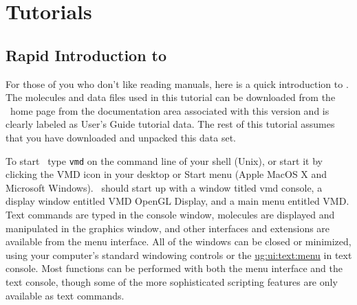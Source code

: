 %
%
%


\chapter{Tutorials}
\label{chapter:tutorial:ug}

\section{Rapid Introduction to \VMD}
For those of you who don't like reading manuals, here is a quick
introduction to \VMD.  The molecules and data files used in this tutorial 
can be downloaded from the \VMD\ home page from the documentation area 
associated with this version and is clearly labeled as User's Guide 
tutorial data.  The rest of this tutorial assumes that you have 
downloaded and unpacked this data set.

To start \VMD\ type {\tt vmd} on the command line of your shell (Unix), or
start it by clicking the VMD icon in your desktop or Start menu (Apple MacOS
X and Microsoft Windows).  \VMD\ should start up with a window titled {\sf
vmd console}, a display window entitled {\sf VMD OpenGL Display}, and a main
menu entitled {\sf VMD}.  Text commands are typed in the console window,
molecules are displayed and manipulated in the graphics window, and other
interfaces and extensions are available from the menu interface.  All of the
windows can be closed or minimized, using your computer's standard windowing
controls or the \hyperref{{\tt menu} command}{{\tt menu} command
[\S}{]}{ug:ui:text:menu} in text console.  Most functions can be performed
with both the menu interface and the text console, though some of the more
sophisticated scripting features are only available as text commands.

